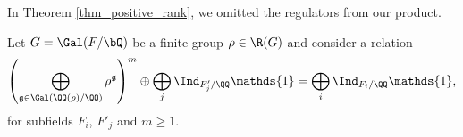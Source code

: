 In Theorem \ref{thm_positive_rank}, we omitted the regulators from our product. 

\begin{prop}
    Let $G = \Gal(F / \bQ)$ be a finite group $\rho \in \R(G)$ and consider a relation
    \[ \left(\bigoplus_{\mathfrak{g}\in\Gal(\QQ(\rho)/\QQ)}\rho^{\mathfrak{g}}\right)^m\oplus\bigoplus_j\Ind_{F'_j/\QQ}\mathds{1}=\bigoplus_i\Ind_{F_i/\QQ}\mathds{1}, \]
    for subfields $F_i$, $F'_j$ and $m \geq 1$. 
    
    
\end{prop} 